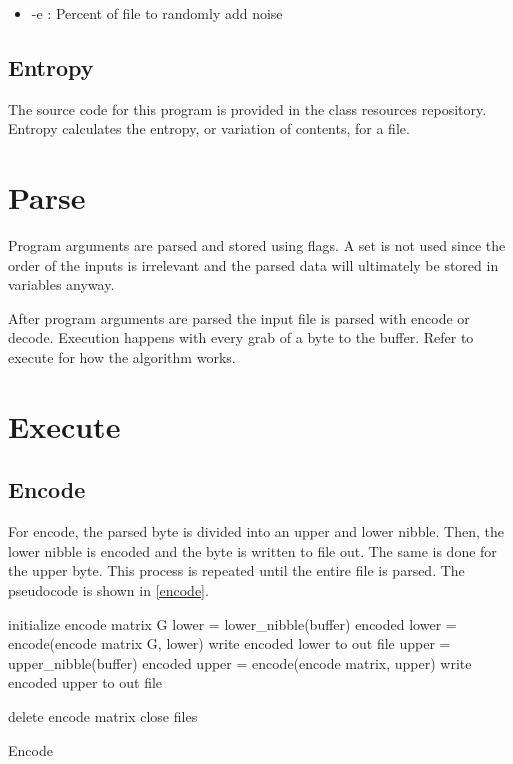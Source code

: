 \documentclass[12pt]{article}
\begin{document}
\begin{itemize}
    \item{-e : Percent of file to randomly add noise}
\end{itemize}

\subsection{Entropy}

The source code for this program is provided in the class resources repository.
Entropy calculates the entropy, or variation of contents, for a file.

\section{Parse}

Program arguments are parsed and stored using flags.
A set is not used since the order of the inputs is irrelevant and the parsed data
will ultimately be stored in variables anyway.

After program arguments are parsed the input file is parsed with encode or decode.
Execution happens with every grab of a byte to the buffer.
Refer to execute for how the algorithm works.

\section{Execute}

\subsection{Encode}

For encode, the parsed byte is divided into an upper and lower nibble. 
Then, the lower nibble is encoded and the byte is written to file out.
The same is done for the upper byte.
This process is repeated until the entire file is parsed. The pseudocode
is shown in \vref{encode}.

\begin{algorithm}
    initialize encode matrix G\;
     {
        lower = lower\_nibble(buffer)\;
        encoded lower = encode(encode matrix G, lower)\;
        write encoded lower to out file\;
        \vspace{0.4em}
        upper = upper\_nibble(buffer)\;
        encoded upper = encode(encode matrix, upper)\;
        write encoded upper to out file\;
    }

    delete encode matrix\;
    close files\;
    \caption{Encode}\label{encode}
\end{algorithm}
\end{document}
